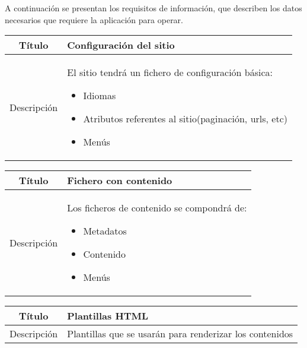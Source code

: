 A continuación se presentan los requisitos de información, que describen los datos
necesarios que requiere la aplicación para operar.

\begin{center}

    \begin{tabularx}{\textwidth}{|c|X|}
        \hline
        Título & Configuración del sitio\\

        \hline

        Descripción & El sitio tendrá un fichero de configuración básica: 
        \begin{itemize}
            \item Idiomas
            \item Atributos referentes al sitio(paginación, urls, etc)
            \item Menús
        \end{itemize}\\

        \hline
    \end{tabularx}
\end{center}

\begin{center}

    \begin{tabularx}{\textwidth}{|c|X|}
        \hline
        Título & Fichero con contenido\\

        \hline

        Descripción & Los ficheros de contenido se compondrá de:
        \begin{itemize}
            \item Metadatos
            \item Contenido
            \item Menús
        \end{itemize}\\

        \hline
    \end{tabularx}
\end{center}

\begin{center}

    \begin{tabularx}{\textwidth}{|c|X|}
        \hline
        Título & Plantillas HTML\\

        \hline

        Descripción & Plantillas que se usarán para renderizar los contenidos\\

        \hline
    \end{tabularx}
\end{center}

